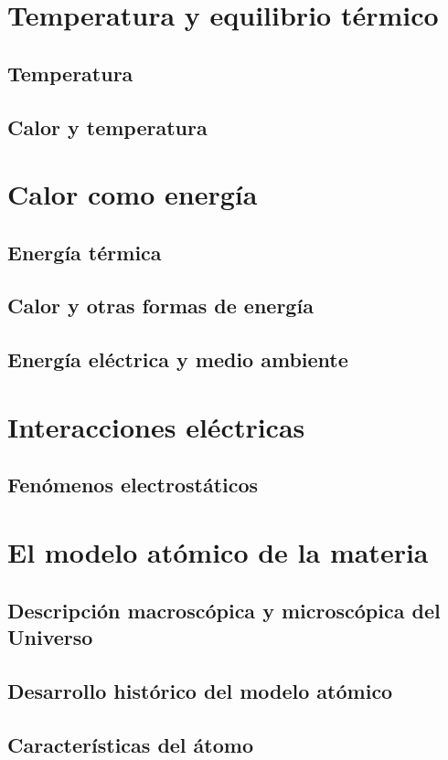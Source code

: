\documentclass[11pt]{book}
\begin{document}
\section{Temperatura y equilibrio t\'ermico}
\subsection{Temperatura}
\subsection{Calor y temperatura}

\section{Calor como energ\'ia}
\subsection{Energ\'ia t\'ermica}
\subsection{Calor y otras formas de energ\'ia}
\subsection{Energ\'ia el\'ectrica y medio ambiente}

\section{Interacciones el\'ectricas}
\subsection{Fen\'omenos electrost\'aticos}

\section{El modelo at\'omico de la materia}
\subsection{Descripci\'on macrosc\'opica y microsc\'opica del Universo}
\subsection{Desarrollo hist\'orico del modelo at\'omico}
\subsection{Caracter\'isticas del \'atomo}
\end{document}
